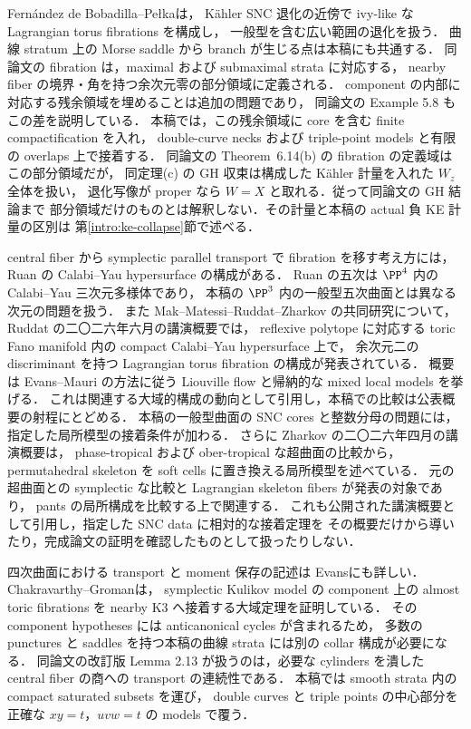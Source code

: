 Fernández de Bobadilla--Pełka\cite[Proposition 5.6, Theorem 6.14]{FBP}は，
Kähler SNC 退化の近傍で ivy-like な Lagrangian torus fibrations を構成し，
一般型を含む広い範囲の退化を扱う．
曲線 stratum 上の Morse saddle から branch が生じる点は本稿にも共通する．
同論文の fibration は，maximal および submaximal strata に対応する，
nearby fiber の境界・角を持つ余次元零の部分領域に定義される．
component の内部に対応する残余領域を埋めることは追加の問題であり，
同論文の Example 5.8 もこの差を説明している．
本稿では，この残余領域に core を含む finite compactification を入れ，
double-curve necks および triple-point models と有限の overlaps 上で接着する．
同論文の Theorem~6.14(b) の fibration の定義域はこの部分領域だが，
同定理(c) の GH 収束は構成した Kähler 計量を入れた $W_z$ 全体を扱い，
退化写像が proper なら $W=X$ と取れる．従って同論文の GH 結論まで
部分領域だけのものとは解釈しない．その計量と本稿の actual 負 KE 計量の区別は
第\ref{intro:ke-collapse}節で述べる．

central fiber から symplectic parallel transport で fibration を移す考え方には，
Ruan の Calabi--Yau hypersurface の構成\cite{Ruan}がある．
Ruan の五次は $\PP^4$ 内の Calabi--Yau 三次元多様体であり，
本稿の $\PP^3$ 内の一般型五次曲面とは異なる次元の問題を扱う．
また Mak--Matessi--Ruddat--Zharkov の共同研究について，
Ruddat の二〇二六年六月の講演概要\cite{RuddatAnnouncement2026}では，
reflexive polytope に対応する toric Fano manifold 内の compact Calabi--Yau hypersurface 上で，
余次元二の discriminant を持つ Lagrangian torus fibration の構成が発表されている．
概要は Evans--Mauri の方法に従う Liouville flow と帰納的な mixed local models を挙げる．
これは関連する大域的構成の動向として引用し，本稿での比較は公表概要の射程にとどめる．
本稿の一般型曲面の SNC cores と整数分母の問題には，指定した局所模型の接着条件が加わる．
さらに Zharkov の二〇二六年四月の講演概要\cite{ZharkovSoftCells2026}は，
phase-tropical および ober-tropical な超曲面の比較から，
permutahedral skeleton を soft cells に置き換える局所模型を述べている．
元の超曲面との symplectic な比較と Lagrangian skeleton fibers が発表の対象であり，
pants の局所構成を比較する上で関連する．
これも公開された講演概要として引用し，指定した SNC data に相対的な接着定理を
その概要だけから導いたり，完成論文の証明を確認したものとして扱ったりしない．

四次曲面における transport と moment 保存の記述は
Evans\cite[Chapter 6]{EvansNotes}にも詳しい．
Chakravarthy--Groman\cite[Theorem 1.6]{CGK3}は，
symplectic Kulikov model の component 上の almost toric fibrations を
nearby K3 へ接着する大域定理を証明している．
その component hypotheses には anticanonical cycles が含まれるため，
多数の punctures と saddles を持つ本稿の曲線 strata には別の collar 構成が必要になる．
同論文の改訂版 Lemma 2.13 が扱うのは，必要な cylinders を潰した
central fiber の商への transport の連続性である．
本稿では smooth strata 内の compact saturated subsets を運び，
double curves と triple points の中心部分を正確な $xy=t$，$uvw=t$ の models で覆う．

